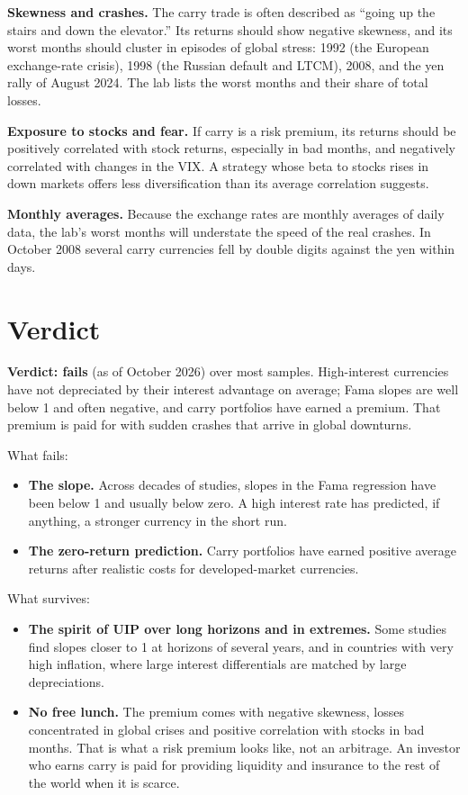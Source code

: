 \textbf{Skewness and crashes.} The carry trade is often described as ``going up the stairs and down the elevator.'' Its returns should show negative skewness, and its worst months should cluster in episodes of global stress: 1992 (the European exchange-rate crisis), 1998 (the Russian default and LTCM), 2008, and the yen rally of August 2024. The lab lists the worst months and their share of total losses.

\textbf{Exposure to stocks and fear.} If carry is a risk premium, its returns should be positively correlated with stock returns, especially in bad months, and negatively correlated with changes in the VIX. A strategy whose beta to stocks rises in down markets offers less diversification than its average correlation suggests.

\textbf{Monthly averages.} Because the exchange rates are monthly averages of daily data, the lab's worst months will understate the speed of the real crashes. In October 2008 several carry currencies fell by double digits against the yen within days.

\section{Verdict}
\label{sec:18-verdict}

\begin{callout}
\textbf{Verdict: fails} (as of October 2026) over most samples. High-interest currencies have not depreciated by their interest advantage on average; Fama slopes are well below 1 and often negative, and carry portfolios have earned a premium. That premium is paid for with sudden crashes that arrive in global downturns.
\end{callout}

What fails:

\begin{itemize}
  \item \textbf{The slope.} Across decades of studies, slopes in the Fama regression have been below 1 and usually below zero. A high interest rate has predicted, if anything, a stronger currency in the short run.
  \item \textbf{The zero-return prediction.} Carry portfolios have earned positive average returns after realistic costs for developed-market currencies.
\end{itemize}

What survives:

\begin{itemize}
  \item \textbf{The spirit of UIP over long horizons and in extremes.} Some studies find slopes closer to 1 at horizons of several years, and in countries with very high inflation, where large interest differentials are matched by large depreciations.
  \item \textbf{No free lunch.} The premium comes with negative skewness, losses concentrated in global crises and positive correlation with stocks in bad months. That is what a risk premium looks like, not an arbitrage. An investor who earns carry is paid for providing liquidity and insurance to the rest of the world when it is scarce.
\end{itemize}

